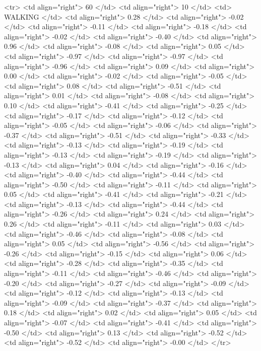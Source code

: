   <tr> <td align="right"> 60 </td> <td align="right">  10 </td> <td> WALKING </td> <td align="right"> 0.28 </td> <td align="right"> -0.02 </td> <td align="right"> -0.11 </td> <td align="right"> -0.18 </td> <td align="right"> -0.02 </td> <td align="right"> -0.40 </td> <td align="right"> 0.96 </td> <td align="right"> -0.08 </td> <td align="right"> 0.05 </td> <td align="right"> -0.97 </td> <td align="right"> -0.97 </td> <td align="right"> -0.96 </td> <td align="right"> 0.09 </td> <td align="right"> 0.00 </td> <td align="right"> -0.02 </td> <td align="right"> -0.05 </td> <td align="right"> 0.08 </td> <td align="right"> -0.51 </td> <td align="right"> 0.01 </td> <td align="right"> -0.08 </td> <td align="right"> 0.10 </td> <td align="right"> -0.41 </td> <td align="right"> -0.25 </td> <td align="right"> -0.17 </td> <td align="right"> -0.12 </td> <td align="right"> -0.05 </td> <td align="right"> -0.06 </td> <td align="right"> -0.37 </td> <td align="right"> -0.51 </td> <td align="right"> -0.33 </td> <td align="right"> -0.13 </td> <td align="right"> -0.19 </td> <td align="right"> -0.13 </td> <td align="right"> -0.19 </td> <td align="right"> -0.13 </td> <td align="right"> 0.04 </td> <td align="right"> -0.16 </td> <td align="right"> -0.40 </td> <td align="right"> -0.44 </td> <td align="right"> -0.50 </td> <td align="right"> -0.11 </td> <td align="right"> 0.05 </td> <td align="right"> -0.41 </td> <td align="right"> -0.21 </td> <td align="right"> -0.13 </td> <td align="right"> -0.44 </td> <td align="right"> -0.26 </td> <td align="right"> 0.24 </td> <td align="right"> 0.26 </td> <td align="right"> -0.11 </td> <td align="right"> 0.03 </td> <td align="right"> -0.46 </td> <td align="right"> -0.08 </td> <td align="right"> 0.05 </td> <td align="right"> -0.56 </td> <td align="right"> -0.26 </td> <td align="right"> -0.15 </td> <td align="right"> 0.06 </td> <td align="right"> -0.28 </td> <td align="right"> -0.35 </td> <td align="right"> -0.11 </td> <td align="right"> -0.46 </td> <td align="right"> -0.20 </td> <td align="right"> -0.27 </td> <td align="right"> -0.09 </td> <td align="right"> -0.12 </td> <td align="right"> -0.13 </td> <td align="right"> -0.09 </td> <td align="right"> -0.37 </td> <td align="right"> 0.18 </td> <td align="right"> 0.02 </td> <td align="right"> 0.05 </td> <td align="right"> -0.07 </td> <td align="right"> -0.41 </td> <td align="right"> -0.50 </td> <td align="right"> 0.13 </td> <td align="right"> -0.52 </td> <td align="right"> -0.52 </td> <td align="right"> -0.00 </td> </tr>
